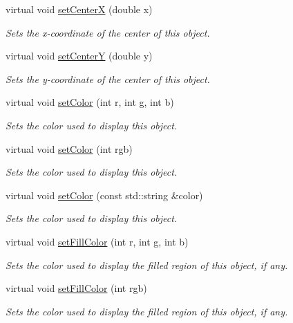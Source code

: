\begin{DoxyCompactItemize}
virtual void \mbox{\hyperlink{classsgl_1_1GObject_a2f4936281e056eead00a9186b9ba8af6}{set\+CenterX}} (double x)
\begin{DoxyCompactList}\small\item\em Sets the x-\/coordinate of the center of this object. \end{DoxyCompactList}\item 
virtual void \mbox{\hyperlink{classsgl_1_1GObject_aad2a22b4fde88c33306b92aebf641d57}{set\+CenterY}} (double y)
\begin{DoxyCompactList}\small\item\em Sets the y-\/coordinate of the center of this object. \end{DoxyCompactList}\item 
virtual void \mbox{\hyperlink{classsgl_1_1GObject_ad57ef49bc31db94e92648aa3737923d6}{set\+Color}} (int r, int g, int b)
\begin{DoxyCompactList}\small\item\em Sets the color used to display this object. \end{DoxyCompactList}\item 
virtual void \mbox{\hyperlink{classsgl_1_1GObject_ab1f5cc0f5cc6bbbd716a526c61f1081d}{set\+Color}} (int rgb)
\begin{DoxyCompactList}\small\item\em Sets the color used to display this object. \end{DoxyCompactList}\item 
virtual void \mbox{\hyperlink{classsgl_1_1GObject_a61374df6c11b52cfbb0815decdbaebc6}{set\+Color}} (const std\+::string \&color)
\begin{DoxyCompactList}\small\item\em Sets the color used to display this object. \end{DoxyCompactList}\item 
virtual void \mbox{\hyperlink{classsgl_1_1GObject_ad767a33971159e9493e221cca4c00ae9}{set\+Fill\+Color}} (int r, int g, int b)
\begin{DoxyCompactList}\small\item\em Sets the color used to display the filled region of this object, if any. \end{DoxyCompactList}\item 
virtual void \mbox{\hyperlink{classsgl_1_1GObject_aa59d9775a67fa7df2b24a95cd34840a3}{set\+Fill\+Color}} (int rgb)
\begin{DoxyCompactList}\small\item\em Sets the color used to display the filled region of this object, if any. \end{DoxyCompactList}\item 

\end{DoxyCompactItemize}
